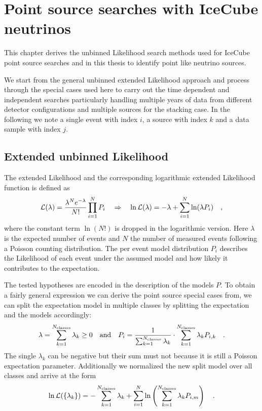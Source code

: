 \chapter{Point source searches with IceCube neutrinos}

This chapter derives the unbinned Likelihood search methods used for IceCube point source searches and in this thesis to identify point like neutrino sources.


We start from the general unbinned extended Likelihood approach and process through the special cases used here to carry out the time dependent and independent searches particularly handling multiple years of data from different detector configurations and multiple sources for the stacking case.
In the following we note a single event with index $i$, a source with index $k$ and a data sample with index $j$.

\section{Extended unbinned Likelihood}
The extended Likelihood  and the corresponding logarithmic extended Likelihood function is defined as
\begin{equation}
  \mathcal{L}(\lambda) = \frac{\lambda^N e^{-\lambda}}{N!}\prod_{i=1}^N P_i
  \quad\Rightarrow\quad
    \ln\mathcal{L}(\lambda) = -\lambda+\sum_{i=1}^N \ln(\lambda P_i)
  \quad\text{,}
\end{equation}
where the constant term $\ln(N!)$ is dropped in the logarithmic version.
Here $\lambda$ is the expected number of events and $N$ the number of measured events following a Poisson counting distribution.
The per event model distribution $P_i$ describes the Likelihood of each event under the assumed model and how likely it contributes to the expectation.

The tested hypotheses are encoded in the description of the models $P$.
To obtain a fairly general expression we can derive the point source special cases from, we can split the expectation model in multiple classes by splitting the expectation and the models accordingly:
\begin{equation}
  \lambda = \sum_{k=1}^{N_\text{classes}} \lambda_k \geq 0
  \quad\text{and}\quad
  P_i = \frac{1}{\sum_{k=1}^{N_\text{classes}} \lambda_k}\cdot
         \sum_{k=1}^{N_\text{classes}} \lambda_k P_{i,k}
  \quad\text{.}
\end{equation}
The single $\lambda_k$ can be negative but their sum must not because it is still a Poisson expectation parameter.
Additionally we normalized the new split model over all classes and arrive at the form
\begin{equation}
  \ln\mathcal{L}(\{\lambda_k\})
  = -\sum_{k=1}^{N_\text{classes}} \lambda_k +
    \sum_{i=1}^N \ln\left(\sum_{k=1}^{N_\text{classes}}
      \lambda_k P_{i,m} \right)
  \quad\text{.}
\end{equation}

